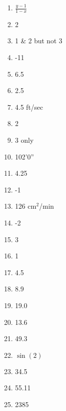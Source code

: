 \documentclass[../uilmath.tex]{subfiles}
\begin{document}
\begin{enumerate}[label=\bfseries\arabic*.]
    \item %
    $\frac{y-1}{1-x}$

    \item %
    2

    \item %
    1 \& 2 but not 3 

    \item %
    -11

    \item %
    6.5

    \item %
    2.5

    \item %
    4.5 ft/sec 

    \item %
    2

    \item %
    3 only 

    \item %
    102'0''

    \item %
    4.25

    \item %
    -1

    \item %
    126 cm$^2$/min 

    \item %
    -2

    \item %
    3

    \item %
    1

    \item %
    4.5

    \item %
    8.9

    \item %
    19.0

    \item %
    13.6

    \item %
    49.3

    \item %
    $\sin(2)$

    \item %
    34.5

    \item %
    55.11

    \item %
    2385


\end{enumerate}
\end{document}
